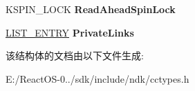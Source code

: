 \begin{DoxyCompactItemize}
\item 
\mbox{\label{struct___p_r_i_v_a_t_e___c_a_c_h_e___m_a_p_a9e81572362d0c81e17f6906445245f52}} 
K\+S\+P\+I\+N\+\_\+\+L\+O\+CK {\bfseries Read\+Ahead\+Spin\+Lock}
\item 
\mbox{\label{struct___p_r_i_v_a_t_e___c_a_c_h_e___m_a_p_ac94a176aecc2441eaea1286628672bc1}} 
\hyperlink{struct___l_i_s_t___e_n_t_r_y}{L\+I\+S\+T\+\_\+\+E\+N\+T\+RY} {\bfseries Private\+Links}
\end{DoxyCompactItemize}


该结构体的文档由以下文件生成\+:\begin{DoxyCompactItemize}
\item 
E\+:/\+React\+O\+S-\/0../sdk/include/ndk/cctypes.\+h\end{DoxyCompactItemize}
